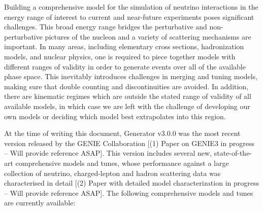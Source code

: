 Building a comprehensive model for the simulation of neutrino interactions in the energy range of interest to current and near-future experiments poses significant challenges. This broad energy range bridges the perturbative and non-perturbative pictures of the nucleon and a variety of scattering mechanisms are important. In many areas, including elementary cross sections, hadronization models, and nuclear physics, one is required to piece together models with different ranges of validity in order to generate events over all of the available phase space. This inevitably introduces challenges in merging and tuning models, making sure that double counting and discontinuities are avoided. In addition, there are kinematic regimes which are outside the stated range of validity of all available models, in which case we are left with the challenge of developing our own models or deciding which model best extrapolates into this region. 

At the time of writing this document, Generator v3.0.0 was the most recent version released by the GENIE Collaboration [(1) Paper on GENIE3 in progress -- Will provide reference ASAP]. This version includes several new, state-of-the-art comprehensive models and tunes, whose performance against a large collection of neutrino, charged-lepton and hadron scattering data was characterised in detail [(2) Paper with detailed model characterization in progress -- Will provide reference ASAP]. The following comprehensive models and tunes are currently available:

